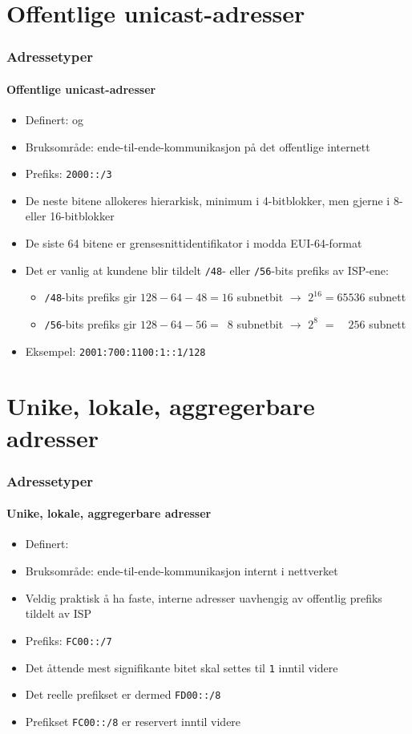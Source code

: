 \section{Offentlige unicast-adresser}
\begin{frame}%
  \frametitle{Adressetyper}
  \framesubtitle{Offentlige unicast-adresser}
  \pause
  \begin{itemize}[<+->]
  \item Definert:  og 
  \item Bruksområde: ende-til-ende-kommunikasjon på det offentlige internett
  \item Prefiks: \texttt{2000::/3}
  \item De neste bitene allokeres hierarkisk, minimum i 4-bitblokker,
    men gjerne i 8- eller 16-bitblokker
  \item De siste 64 bitene er grensesnittidentifikator i modda
    EUI-64-format
  \item Det er vanlig at kundene blir tildelt \texttt{/48}- eller
    \texttt{/56}-bits prefiks av ISP-ene:
    \begin{itemize}[<+->]
    \item \texttt{/48}-bits prefiks gir \(128-64-48=16\) subnetbit \(\to\) \(2^{16}=65536\) subnett
    \item \texttt{/56}-bits prefiks gir \(128-64-56=\phantom{1}8\) subnetbit \(\to\) \(2^{8\phantom{6}}=\phantom{65}256\) subnett
    \end{itemize}
  \item Eksempel: \texttt{2001:700:1100:1::1/128}
  \end{itemize}
\end{frame}

\section{Unike, lokale, aggregerbare adresser}
\begin{frame}%
  \frametitle{Adressetyper}
  \framesubtitle{Unike, lokale, aggregerbare adresser}
  \pause
  \begin{itemize}[<+->]
  \item Definert: 
  \item Bruksområde: ende-til-ende-kommunikasjon internt i nettverket
  \item Veldig praktisk å ha faste, interne adresser uavhengig av
    offentlig prefiks tildelt av ISP
  \item Prefiks: \texttt{FC00::/7}
  \item Det åttende mest signifikante bitet skal settes til \texttt{1}
    inntil videre
  \item Det reelle prefikset er dermed
    \texttt{\alert{FD}00::/\alert{8}}
  \item Prefikset \texttt{\alert{FC}00::/\alert{8}} er reservert
    inntil videre
  \end{itemize}
\end{frame}

